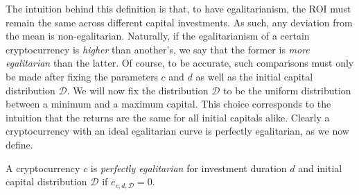 The intuition behind this definition is that, to have egalitarianism, the ROI
must remain the same across different capital investments. As such, any
deviation from the mean is non-egalitarian. Naturally, if the
egalitarianism of a certain cryptocurrency is \emph{higher} than another's, we
say that the former is \emph{more egalitarian} than the latter. Of course, to be
accurate, such comparisons must only be made after fixing the parameters $c$
and $d$ as well as the initial capital distribution $\mathcal{D}$. We will now
fix the distribution $\mathcal{D}$ to be the uniform distribution between a
minimum and a maximum capital. This choice corresponds to the intuition that the
returns are the same for all initial capitals alike. Clearly a cryptocurrency
with an ideal egalitarian curve is perfectly egalitarian, as we now define.

\begin{definition}
  A cryptocurrency $c$ is \emph{perfectly egalitarian} for investment duration
  $d$ and initial capital distribution $\mathcal{D}$ if
  $e_{c,d,\mathcal{D}} = 0$.
\end{definition}
